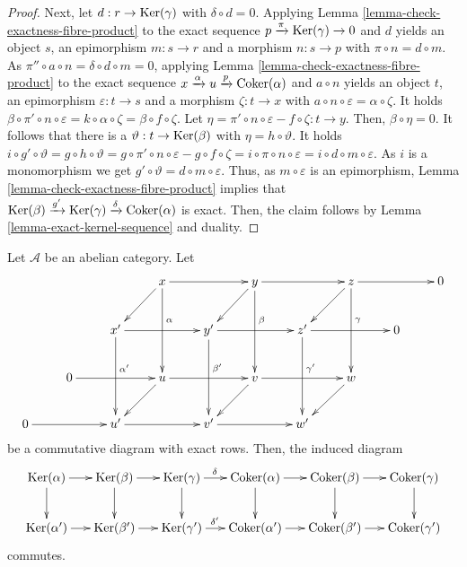 \begin{proof}
\medskip\noindent
Next, let $d : r \to \mathop{\mathrm{Ker}}(\gamma)$ with
$\delta \circ d = 0$. Applying
Lemma
\ref{lemma-check-exactness-fibre-product}
to the exact sequence
$p \xrightarrow{\pi} \mathop{\mathrm{Ker}}(\gamma) \to 0$ and
$d$ yields an object $s$,
an epimorphism $m : s \to r$ and a morphism
$n : s \to p$ with
$\pi \circ n = d \circ m$. As
$\pi'' \circ a \circ n = \delta \circ d \circ
m = 0$,
applying Lemma
\ref{lemma-check-exactness-fibre-product} to
the exact sequence
$x \xrightarrow{\alpha} u \xrightarrow{p}
\mathop{\mathrm{Coker}}(\alpha)$ and
$a \circ n$ yields an object $t$, an
epimorphism $\varepsilon : t \to s$ and
a morphism $\zeta : t \to x$ with
$a \circ n \circ \varepsilon = \alpha \circ
\zeta$.
It holds
$\beta \circ \pi' \circ n \circ \varepsilon =
k \circ \alpha \circ \zeta = \beta \circ f
\circ \zeta$.
Let $\eta = \pi' \circ n \circ \varepsilon -
f \circ \zeta : t \to y$. Then,
$\beta \circ \eta = 0$. It follows that there
is a
$\vartheta : t \to \mathop{\mathrm{Ker}}(\beta)$ with $\eta =
h \circ \vartheta$. It holds
$i \circ g' \circ \vartheta = g \circ h \circ
\vartheta =
g \circ \pi' \circ n \circ \varepsilon - g
\circ f \circ \zeta =
i \circ \pi \circ n \circ \varepsilon = i
\circ d \circ m \circ \varepsilon$.
As $i$ is a monomorphism we get
$g' \circ \vartheta = d \circ m \circ
\varepsilon$.
Thus, as $m \circ \varepsilon$ is an
epimorphism,
Lemma
\ref{lemma-check-exactness-fibre-product}
implies that
$\mathop{\mathrm{Ker}}(\beta) \xrightarrow{g'} \mathop{\mathrm{Ker}}(\gamma)
\xrightarrow{\delta} \mathop{\mathrm{Coker}}(\alpha)$
is exact. Then, the claim follows by Lemma
\ref{lemma-exact-kernel-sequence}
and duality.
\end{proof}

\begin{lemma}
\label{lemma-snake-natural}
Let $\mathcal{A}$ be an abelian category. Let
$$
\xymatrix{
& & & x\ar[ld]\ar[rr]\ar[dd]^(.4)\alpha
& & y\ar[ld]\ar[rr]\ar[dd]^(.4)\beta
& & z\ar[ld]\ar[rr]\ar[dd]^(.4)\gamma
& & 0\\
& & x'\ar[rr]\ar[dd]^(.4){\alpha'}
& & y'\ar[rr]\ar[dd]^(.4){\beta'}
& & z'\ar[rr]\ar[dd]^(.4){\gamma'}
& & 0
& \\
& 0\ar[rr]
& & u\ar[ld]\ar[rr]
& & v\ar[ld]\ar[rr]
& & w\ar[ld]
& & \\
0\ar[rr]
& & u'\ar[rr]
& & v'\ar[rr]
& & w'
& & &
}
$$
be a commutative diagram with exact rows.
Then, the induced diagram
$$
\xymatrix@C=15pt{
\Ker(\alpha) \ar[r] \ar[d] &
\Ker(\beta) \ar[r] \ar[d] &
\Ker(\gamma) \ar[r]^(.45){\delta} \ar[d] &
\Coker(\alpha) \ar[r] \ar[d] &
\Coker(\beta) \ar[r] \ar[d] &
\Coker(\gamma) \ar[d] \\
\Ker(\alpha') \ar[r] &
\Ker(\beta') \ar[r] &
\Ker(\gamma') \ar[r]^(.45){\delta'} &
\Coker(\alpha') \ar[r] &
\Coker(\beta') \ar[r] &
\Coker(\gamma')
}
$$
commutes.
\end{lemma}


